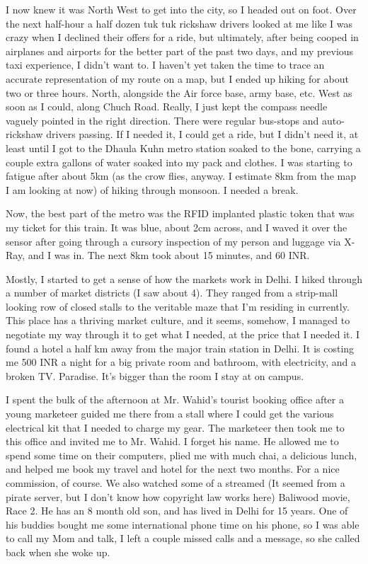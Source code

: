 \documentclass[11pt]{amsart}
\begin{document}
I now knew it was North West to get into the city, so I headed out on foot. Over the next half-hour a half dozen tuk tuk rickshaw drivers looked at me like I was crazy when I declined their offers for a ride, but ultimately, after being cooped in airplanes and airports for the better part of the past two days, and my previous taxi experience, I didn't want to. I haven't yet taken the time to trace an accurate representation of my route on a map, but I ended up hiking for about two or three hours. North, alongside the Air force base, army base, etc. West as soon as I could, along Chuch Road. Really, I just kept the compass needle vaguely pointed in the right direction. There were regular bus-stops and auto-rickshaw drivers passing. If I needed it, I could get a ride, but I didn't need it, at least until I got to the Dhaula Kuhn metro station soaked to the bone, carrying a couple extra gallons of water soaked into my pack and clothes. I was starting to fatigue after about 5km (as the crow flies, anyway. I estimate 8km from the map I am looking at now) of hiking through monsoon. I needed a break.

Now, the best part of the metro was the RFID implanted plastic token that was my ticket for this train. It was blue, about 2cm across, and I waved it over the sensor after going through a cursory inspection of my person and luggage via X-Ray, and I was in. The next 8km took about 15 minutes, and 60 INR.

Mostly, I started to get a sense of how the markets work in Delhi. I hiked through a number of market districts (I saw about 4). They ranged from a strip-mall looking row of closed stalls to the veritable maze that I'm residing in currently. This place has a thriving market culture, and it seems, somehow, I managed to negotiate my way through it to get what I needed, at the price that I needed it. I found a hotel a half km away from the major train station in Delhi. It is costing me 500 INR a night for a big private room and bathroom, with electricity, and a broken TV. Paradise. It's bigger than the room I stay at on campus.

I spent the bulk of the afternoon at Mr. Wahid's tourist booking office after a young marketeer guided me there from a stall where I could get the various electrical kit that I needed to charge my gear. The marketeer then took me to this office and invited me to Mr. Wahid. I forget his name. He allowed me to spend some time on their computers, plied me with much chai, a delicious lunch, and helped me book my travel and hotel for the next two months. For a nice commission, of course. We also watched some of a streamed (It seemed from a pirate server, but I don't know how copyright law works here) Baliwood movie, Race 2. He has an 8 month old son, and has lived in Delhi for 15 years. One of his buddies bought me some international phone time on his phone, so I was able to call my Mom and talk, I left a couple missed calls and a message, so she called back when she woke up.
\end{document}
